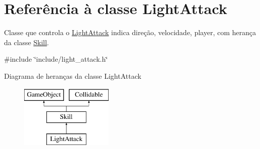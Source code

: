 \hypertarget{classLightAttack}{}\section{Referência à classe Light\+Attack}
\label{classLightAttack}


Classe que controla o \mbox{\hyperlink{classLightAttack}{Light\+Attack}} indica direção, velocidade, player, com herança da classe \mbox{\hyperlink{classSkill}{Skill}}.  




{\ttfamily \#include \char`\"{}include/light\+\_\+attack.\+h\char`\"{}}

Diagrama de heranças da classe Light\+Attack\begin{figure}[H]
\begin{center}
\leavevmode
\includegraphics[height=3.000000cm]{classLightAttack}
\end{center}
\end{figure}
